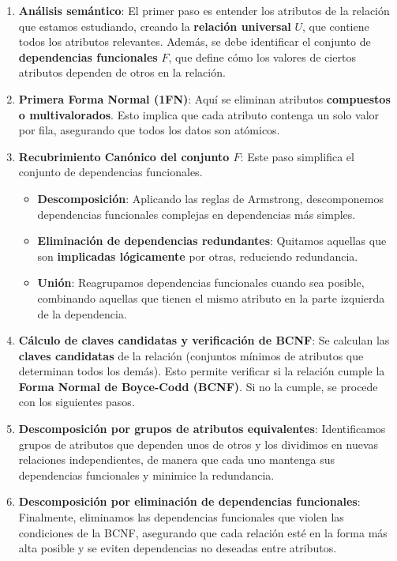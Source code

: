 \documentclass{article}
\begin{document}
\begin{enumerate}
    \item \textbf{Análisis semántico}: El primer paso es entender los atributos de la relación que estamos estudiando, creando la \textbf{relación universal} \( U \), que contiene todos los atributos relevantes. Además, se debe identificar el conjunto de \textbf{dependencias funcionales} \( F \), que define cómo los valores de ciertos atributos dependen de otros en la relación.
    
    \item \textbf{Primera Forma Normal (1FN)}: Aquí se eliminan atributos \textbf{compuestos o multivalorados}. Esto implica que cada atributo contenga un solo valor por fila, asegurando que todos los datos son atómicos.
    
    \item \textbf{Recubrimiento Canónico del conjunto \( F \)}: Este paso simplifica el conjunto de dependencias funcionales.
    \begin{itemize}
        \item \textbf{Descomposición}: Aplicando las reglas de Armstrong, descomponemos dependencias funcionales complejas en dependencias más simples.
        \item \textbf{Eliminación de dependencias redundantes}: Quitamos aquellas que son \textbf{implicadas lógicamente} por otras, reduciendo redundancia.
        \item \textbf{Unión}: Reagrupamos dependencias funcionales cuando sea posible, combinando aquellas que tienen el mismo atributo en la parte izquierda de la dependencia.
    \end{itemize}
    
    \item \textbf{Cálculo de claves candidatas y verificación de BCNF}: Se calculan las \textbf{claves candidatas} de la relación (conjuntos mínimos de atributos que determinan todos los demás). Esto permite verificar si la relación cumple la \textbf{Forma Normal de Boyce-Codd (BCNF)}. Si no la cumple, se procede con los siguientes pasos.
    
    \item \textbf{Descomposición por grupos de atributos equivalentes}: Identificamos grupos de atributos que dependen unos de otros y los dividimos en nuevas relaciones independientes, de manera que cada uno mantenga sus dependencias funcionales y minimice la redundancia.
    
    \item \textbf{Descomposición por eliminación de dependencias funcionales}: Finalmente, eliminamos las dependencias funcionales que violen las condiciones de la BCNF, asegurando que cada relación esté en la forma más alta posible y se eviten dependencias no deseadas entre atributos.
\end{enumerate}
\end{document}
